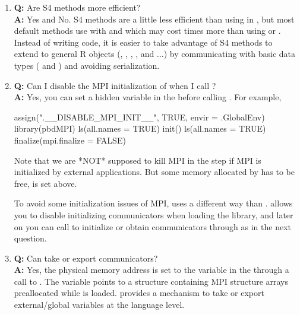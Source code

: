 \begin{enumerate}
\item {\bf\color{blue} Q:}
      Are S4 methods more efficient? \\
      {\bf\color{blue} A:}
      Yes and No. S4 methods are a little less efficient than using
       in , but most default
      methods use  with  and 
      which may cost  times more than using
       or .
      Instead of writing  code, it is easier to take
      advantage of S4 methods to extend to general R objects (,
      , , , and  ...)
      by communicating with basic data types
      ( and ) and avoiding serialization.

\item {\bf\color{blue} Q:}
      Can I disable the MPI initialization of  when I call
      ? \\
      {\bf\color{blue} A:}
      Yes, you can set a hidden variable  in the
       before calling .
      For example,
\begin{Code}[title=SPMD R Script]
assign(".__DISABLE_MPI_INIT__", TRUE, envir = .GlobalEnv)
library(pbdMPI)
ls(all.names = TRUE)
init()
ls(all.names = TRUE)
finalize(mpi.finalize = FALSE)
\end{Code}
      Note that we are *NOT* supposed to kill MPI in the  step
      if MPI is initialized by external applications. But some memory allocated
      by  has to be free,  is set above.

      To avoid some initialization issues of MPI,  uses a
      different way than .  allows you to disable
      initializing communicators when loading the library, and later on you can
      call  to initialize or obtain communicators through
       as in the next question.

\item {\bf\color{blue} Q:}
      Can  take or export communicators? \\
      {\bf\color{blue} A:}
      Yes, the physical memory address is set to the variable
       in the  through a call to
      . The variable points to a structure containing MPI
      structure arrays preallocated while  is loaded.
       provides a mechanism to take or export
      external/global variables at the  language level.

\end{enumerate}




